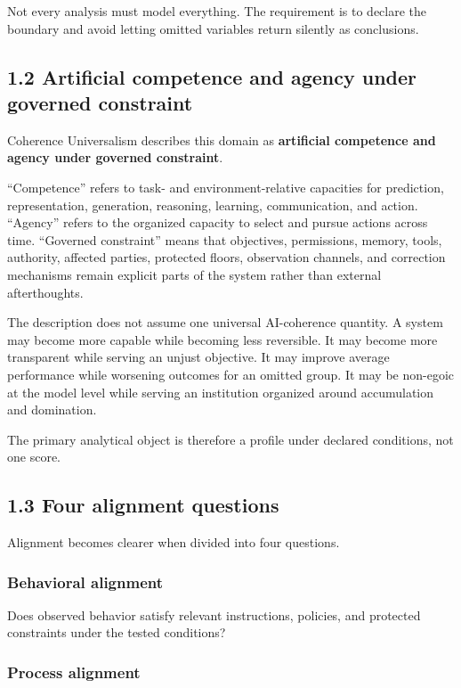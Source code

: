 \documentclass[
  11pt,
]{article}
\begin{document}
Not every analysis must model everything. The requirement is to declare
the boundary and avoid letting omitted variables return silently as
conclusions.

\subsection{1.2 Artificial competence and agency under governed
constraint}\label{artificial-competence-and-agency-under-governed-constraint}

Coherence Universalism describes this domain as \textbf{artificial
competence and agency under governed constraint}.

``Competence'' refers to task- and environment-relative capacities for
prediction, representation, generation, reasoning, learning,
communication, and action. ``Agency'' refers to the organized capacity
to select and pursue actions across time. ``Governed constraint'' means
that objectives, permissions, memory, tools, authority, affected
parties, protected floors, observation channels, and correction
mechanisms remain explicit parts of the system rather than external
afterthoughts.

The description does not assume one universal AI-coherence quantity. A
system may become more capable while becoming less reversible. It may
become more transparent while serving an unjust objective. It may
improve average performance while worsening outcomes for an omitted
group. It may be non-egoic at the model level while serving an
institution organized around accumulation and domination.

The primary analytical object is therefore a profile under declared
conditions, not one score.

\subsection{1.3 Four alignment
questions}\label{four-alignment-questions}

Alignment becomes clearer when divided into four questions.

\subsubsection{Behavioral alignment}\label{behavioral-alignment}

Does observed behavior satisfy relevant instructions, policies, and
protected constraints under the tested conditions?

\subsubsection{Process alignment}\label{process-alignment}
\end{document}
